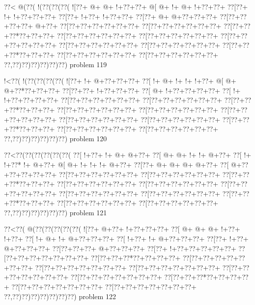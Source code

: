 \vbox{\vbox{\goo
\0??<\- @(\0??(\- !(\0??(\0??(\0??(
\- ![\0??+\- @+\- @+\- !+\0??+\0??+
\- @[\- @+\- !+\- @+\- !+\0??+\0??+
\0??[\0??+\- !+\- !+\0??+\0??+\0??+
\0??[\0??+\- !+\0??+\- !+\0??+\0??+
\0??[\0??+\- @+\- @+\0??+\0??+\0??+
\0??[\0??+\0??+\0??+\0??+\- @+\0??+
\0??[\0??+\0??+\0??+\0??+\0??+\0??+
\0??[\0??+\0??+\0??+\0??+\0??+\0??+
\0??[\0??+\0??+\0??*\0??+\0??+\0??+
\0??[\0??+\0??+\0??+\0??+\0??+\0??+
\0??[\0??+\0??+\0??+\0??+\0??+\0??+
\0??[\0??+\0??+\0??+\0??+\0??+\0??+
\0??[\0??+\0??+\0??+\0??+\0??+\0??+
\0??[\0??+\0??+\0??+\0??+\0??+\0??+
\0??[\0??+\0??+\0??*\0??+\0??+\0??+
\0??[\0??+\0??+\0??+\0??+\0??+\0??+
\0??[\0??+\0??+\0??+\0??+\0??+\0??+
\0??,\0??)\0??)\0??)\0??)\0??)\0??)
}
\hfil problem 119\hfil\break
}

\vbox{\vbox{\goo
\- !<\0??(\- !(\0??(\0??(\0??(\0??(
\- ![\0??+\- !+\- @+\0??+\0??+\0??+
\0??[\- !+\- @+\- !+\- !+\- !+\0??+
\- @[\- @+\- @+\0??*\0??+\0??+\0??+
\0??[\0??+\0??+\- !+\0??+\0??+\0??+
\0??[\- @+\- !+\0??+\0??+\0??+\0??+
\0??[\- !+\- !+\0??+\0??+\0??+\0??+
\0??[\0??+\0??+\0??+\0??+\0??+\0??+
\0??[\0??+\0??+\0??+\0??+\0??+\0??+
\0??[\0??+\0??+\0??*\0??+\0??+\0??+
\0??[\0??+\0??+\0??+\0??+\0??+\0??+
\0??[\0??+\0??+\0??+\0??+\0??+\0??+
\0??[\0??+\0??+\0??+\0??+\0??+\0??+
\0??[\0??+\0??+\0??+\0??+\0??+\0??+
\0??[\0??+\0??+\0??+\0??+\0??+\0??+
\0??[\0??+\0??+\0??*\0??+\0??+\0??+
\0??[\0??+\0??+\0??+\0??+\0??+\0??+
\0??[\0??+\0??+\0??+\0??+\0??+\0??+
\0??,\0??)\0??)\0??)\0??)\0??)\0??)
}
\hfil problem 120\hfil\break
}

\vbox{\vbox{\goo
\0??<\0??(\0??(\0??(\0??(\0??(\0??(
\0??[\- !+\0??+\- !+\- @+\- @+\0??+
\0??[\- @+\- @+\- !+\- !+\- @+\0??+
\0??[\- !+\- !+\0??*\- !+\- @+\0??+
\- @[\- @+\- !+\- !+\- !+\- @+\0??+
\0??[\0??+\- @+\- @+\- @+\- @+\0??+
\0??[\- @+\0??+\0??+\0??+\0??+\0??+
\0??[\0??+\0??+\0??+\0??+\0??+\0??+
\0??[\0??+\0??+\0??+\0??+\0??+\0??+
\0??[\0??+\0??+\0??*\0??+\0??+\0??+
\0??[\0??+\0??+\0??+\0??+\0??+\0??+
\0??[\0??+\0??+\0??+\0??+\0??+\0??+
\0??[\0??+\0??+\0??+\0??+\0??+\0??+
\0??[\0??+\0??+\0??+\0??+\0??+\0??+
\0??[\0??+\0??+\0??+\0??+\0??+\0??+
\0??[\0??+\0??+\0??*\0??+\0??+\0??+
\0??[\0??+\0??+\0??+\0??+\0??+\0??+
\0??[\0??+\0??+\0??+\0??+\0??+\0??+
\0??,\0??)\0??)\0??)\0??)\0??)\0??)
}
\hfil problem 121\hfil\break
}

\vbox{\vbox{\goo
\0??<\0??(\- @(\0??(\0??(\0??(\0??(\0??(
\- ![\0??+\- @+\0??+\- !+\0??+\0??+\0??+
\0??[\- @+\- @+\- @+\- !+\0??+\- !+\0??+
\0??[\- !+\- @+\- !+\- @+\0??+\0??+\0??+
\0??[\- !+\0??+\- !+\- @+\0??+\0??+\0??+
\0??[\0??+\- !+\0??+\- @+\0??+\0??+\0??+
\0??[\0??+\0??+\0??+\- @+\0??+\0??+\0??+
\0??[\0??+\- !+\0??+\0??+\0??+\0??+\0??+
\0??[\0??+\0??+\0??+\0??+\0??+\0??+\0??+
\0??[\0??+\0??+\0??*\0??+\0??+\0??+\0??+
\0??[\0??+\0??+\0??+\0??+\0??+\0??+\0??+
\0??[\0??+\0??+\0??+\0??+\0??+\0??+\0??+
\0??[\0??+\0??+\0??+\0??+\0??+\0??+\0??+
\0??[\0??+\0??+\0??+\0??+\0??+\0??+\0??+
\0??[\0??+\0??+\0??+\0??+\0??+\0??+\0??+
\0??[\0??+\0??+\0??*\0??+\0??+\0??+\0??+
\0??[\0??+\0??+\0??+\0??+\0??+\0??+\0??+
\0??[\0??+\0??+\0??+\0??+\0??+\0??+\0??+
\0??,\0??)\0??)\0??)\0??)\0??)\0??)\0??)
}
\hfil problem 122\hfil\break
}

